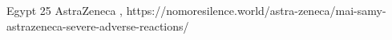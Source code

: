           {Egypt}
          {25}
          {AstraZeneca}
          {}
          {
            ,
          }
          {https://nomoresilence.world/astra-zeneca/mai-samy-astrazeneca-severe-adverse-reactions/}



